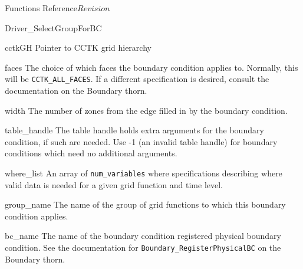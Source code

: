 \begin{cactuspart}{ Functions Reference}{}{$Revision$}
\begin{FunctionDescription}{Driver\_SelectGroupForBC}
\begin{ParameterSection}
\begin{Parameter}{cctkGH}
Pointer to CCTK grid hierarchy
\end{Parameter}
\end{ParameterSection}

\begin{ParameterSection}
\begin{Parameter}{faces}
The choice of which faces the boundary condition applies to.
Normally, this will be \texttt{CCTK\_ALL\_FACES}. If a different
specification is desired, consult the documentation on the
Boundary thorn.
\end{Parameter}
\end{ParameterSection}

\begin{ParameterSection}
\begin{Parameter}{width}
The number of zones from the edge filled in by the boundary condition.
\end{Parameter}
\end{ParameterSection}

\begin{ParameterSection}
\begin{Parameter}{table\_handle}
The table handle holds extra arguments for the boundary condition, if such are needed. Use
-1 (an invalid table handle) for boundary conditions which need no additional arguments.
\end{Parameter}
\end{ParameterSection}

\begin{ParameterSection}
\begin{Parameter}{where\_list}
An array of \texttt{num\_variables} where specifications describing
where valid data is needed for a given grid function and time level.
\end{Parameter}
\end{ParameterSection}

\begin{ParameterSection}
\begin{Parameter}{group\_name}
The name of the group of grid functions to which this boundary condition applies.
\end{Parameter}
\end{ParameterSection}

\begin{ParameterSection}
\begin{Parameter}{bc\_name}
The name of the boundary condition registered physical boundary condition.
See the documentation for \texttt{Boundary\_RegisterPhysicalBC} on the
Boundary thorn.
\end{Parameter}
\end{ParameterSection}


\end{FunctionDescription}
\end{cactuspart}
